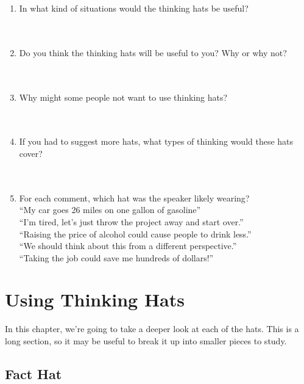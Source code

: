 \begin{enumerate}
	\item In what kind of situations would the thinking hats be useful? ~\\~\\~\\
	\item Do you think the thinking hats will be useful to you? Why or why not? ~\\~\\~\\
	\item Why might some people not want to use thinking hats? ~\\~\\~\\
	\item If you had to suggest more hats, what types of thinking would these hats cover? ~\\~\\~\\
	\item For each comment, which hat was the speaker likely wearing? \\
		``My car goes 26 miles on one gallon of gasoline'' \\
		``I'm tired, let's just throw the project away and start over.'' \\
		``Raising the price of alcohol could cause people to drink less.'' \\
		``We should think about this from a different perspective.'' \\
		``Taking the job could save me hundreds of dollars!''
\end{enumerate}

\chapter{Using Thinking Hats}


In this chapter, we're going to take a deeper look at each of the hats. This is a long section, so it may be useful to break it up into smaller pieces to study.

\section*{Fact Hat}

